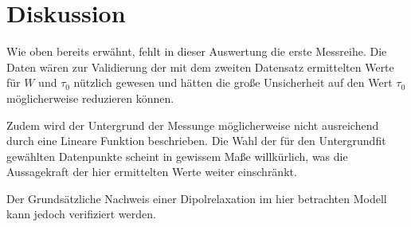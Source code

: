 \newpage
\section{Diskussion}
\label{sec:diskussion}
Wie oben bereits erwähnt, fehlt in dieser Auswertung die erste Messreihe.
Die Daten wären zur Validierung der mit dem zweiten Datensatz ermittelten Werte
für $W$ und $\tau_0$ nützlich gewesen und hätten die große Unsicherheit
auf den Wert $\tau_0$ möglicherweise reduzieren können.

Zudem wird der Untergrund der Messunge möglicherweise nicht ausreichend durch
eine Lineare Funktion beschrieben. Die Wahl der für den Untergrundfit gewählten
Datenpunkte scheint in gewissem Maße willkürlich, was die Aussagekraft der
hier ermittelten Werte weiter einschränkt.

Der Grundsätzliche Nachweis einer Dipolrelaxation im hier betrachten Modell
kann jedoch verifiziert werden.
